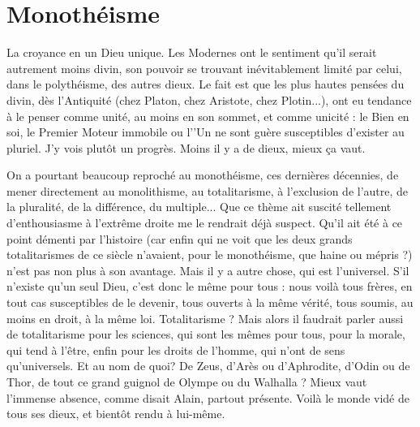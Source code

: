 \section{Monothéisme}
La croyance en un Dieu unique. Les Modernes ont le sentiment
qu’il serait autrement moins divin, son pouvoir se
trouvant inévitablement limité par celui, dans le polythéisme, des autres dieux.
Le fait est que les plus hautes pensées du divin, dès l’Antiquité (chez Platon,
chez Aristote, chez Plotin...), ont eu tendance à le penser comme unité, au
moins en son sommet, et comme unicité : le Bien en soi, le Premier Moteur
immobile ou l’'Un ne sont guère susceptibles d’exister au pluriel. J'y vois plutôt
un progrès. Moins il y a de dieux, mieux ça vaut.

On a pourtant beaucoup reproché au monothéisme, ces dernières décennies,
de mener directement au monolithisme, au totalitarisme, à l'exclusion de
l’autre, de la pluralité, de la différence, du multiple... Que ce thème ait suscité
tellement d’enthousiasme à l’extrême droite me le rendrait déjà suspect. Qu'il
ait été à ce point démenti par l’histoire (car enfin qui ne voit que les deux
grands totalitarismes de ce siècle n’avaient, pour le monothéisme, que haine ou
mépris ?) n’est pas non plus à son avantage. Mais il y a autre chose, qui est
l’universel. S’il n’existe qu’un seul Dieu, c’est donc le même pour tous : nous
voilà tous frères, en tout cas susceptibles de le devenir, tous ouverts à la même
vérité, tous soumis, au moins en droit, à la même loi. Totalitarisme ? Mais alors
il faudrait parler aussi de totalitarisme pour les sciences, qui sont les mêmes
pour tous, pour la morale, qui tend à l’être, enfin pour les droits de l’homme,
qui n’ont de sens qu’universels. Et au nom de quoi? De Zeus, d’Arès ou
d’Aphrodite, d’Odin ou de Thor, de tout ce grand guignol de Olympe ou du
Walhalla ? Mieux vaut l'immense absence, comme disait Alain, partout présente.
Voilà le monde vidé de tous ses dieux, et bientôt rendu à lui-même.

